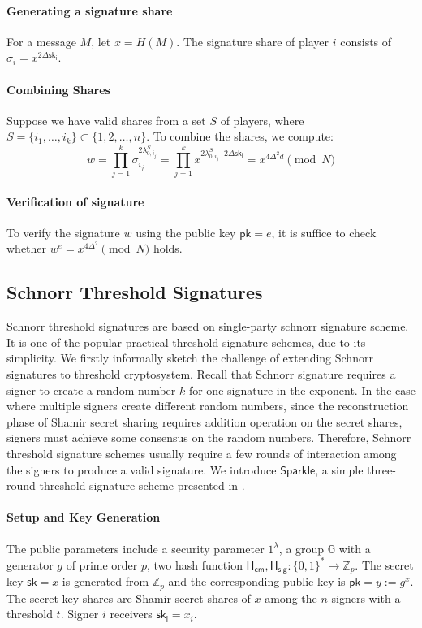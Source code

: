 \paragraph{Generating a signature share} For a message $M$, let $x=H(M)$. The signature share of player $i$ consists of $\sigma_i = x^{2 \Delta \mathsf{sk_i}}$. 

\paragraph{Combining Shares} Suppose we have valid shares from a set $S$ of players, where $S=\{i_1, \dots, i_k\}\subset \{1, 2, \dots, n\}$. To combine the shares, we compute: 
\begin{equation*}
    w=\prod_{j=1}^k \sigma_{i_j}^{2\lambda_{0, i_j}^S} = \prod_{j=1}^k x^{2\lambda_{0, i_j}^S \cdot 2\Delta \mathsf{sk_i}} =x^{4\Delta^2 d}\pmod {N}
\end{equation*} 

\paragraph{Verification of signature} To verify the signature $w$ using the public key $\mathsf{pk}=e$, it is suffice to check whether $w^e=x^{4\Delta^2}\pmod{N}$ holds. 


\subsection{Schnorr Threshold Signatures}
Schnorr threshold signatures are based on single-party schnorr signature scheme. It is one of the popular practical threshold signature schemes, due to its simplicity. We firstly informally sketch the challenge of extending Schnorr signatures to threshold cryptosystem. Recall that Schnorr signature requires a signer to create a random number $k$ for one signature in the exponent. In the case where multiple signers create different random numbers, since the reconstruction phase of Shamir secret sharing requires addition operation on the secret shares, signers must achieve some consensus on the random numbers. Therefore, Schnorr threshold signature schemes usually require a few rounds of interaction among the signers to produce a valid signature. We introduce $\mathsf{Sparkle}$, a simple three-round threshold signature scheme presented in \cite{DBLP:conf/crypto/CritesKM23}.

\paragraph{Setup and Key Generation} The public parameters include a security parameter $1^\lambda$, a group $\mathbb{G}$ with a generator $g$ of prime order $p$, two hash function $\mathsf{H_{cm}}, \mathsf{H_{sig}}: \{0,1\}^\ast \to \mathbb{Z}_p$. The secret key $\mathsf{sk}=x$ is generated from $\mathbb{Z}_p$ and the corresponding public key is $\mathsf{pk}=y:=g^x$. The secret key shares are Shamir secret shares of $x$ among the $n$ signers with a threshold $t$. Signer $i$ receivers $\mathsf{sk_i}=x_i$. 

